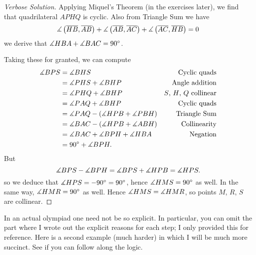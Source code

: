\documentclass[11pt]{scrartcl}
\begin{document}
\begin{proof}
	[Verbose Solution]
	Applying Miquel's Theorem (in the exercises later),
	we find that quadrilateral $APHQ$ is cyclic.
	Also from Triangle Sum we have
	\[ \measuredangle \left( \overline{HB}, \overline{AB} \right)
		+ \measuredangle \left( \overline{AB}, \overline{AC} \right)
		+ \measuredangle \left( \overline{AC}, \overline{HB} \right)
		= 0 \]
	 we derive that $\measuredangle HBA + \measuredangle BAC = 90^\circ$.

	Taking these for granted,
	we can compute
	\begin{align*}
		\measuredangle BPS &= \measuredangle BHS & \text{Cyclic quads} \\
		&= \measuredangle PHS + \measuredangle BHP & \text{Angle addition} \\
		&= \measuredangle PHQ + \measuredangle BHP & \text{$S$, $H$, $Q$ collinear} \\
		&= \measuredangle PAQ + \measuredangle BHP & \text{Cyclic quads} \\
		&= \measuredangle PAQ - (\measuredangle HPB + \measuredangle PBH) & \text{Triangle Sum} \\
		&= \measuredangle BAC - (\measuredangle HPB + \measuredangle ABH) & \text{Collinearity} \\
		&= \measuredangle BAC + \measuredangle BPH + \measuredangle HBA & \text{Negation} \\
		&= 90^\circ + \measuredangle BPH. &
	\end{align*}
	But \[ \measuredangle BPS - \measuredangle BPH
		= \measuredangle BPS + \measuredangle HPB = \measuredangle HPS. \]
	so we deduce that $\measuredangle HPS = -90^\circ = 90^\circ$,
	hence $\measuredangle HMS = 90^\circ$ as well.
	In the same way, $\measuredangle HMR = 90^\circ$ as well.
	Hence $\measuredangle HMS = \measuredangle HMR$, so points $M$, $R$, $S$ are collinear.
\end{proof}
In an actual olympiad one need not be so explicit.
In particular, you can omit the part where I wrote out the explicit reasons
for each step; I only provided this for reference.
Here is a second example (much harder) in which I will be much more succinct.
See if you can follow along the logic.
\end{document}
